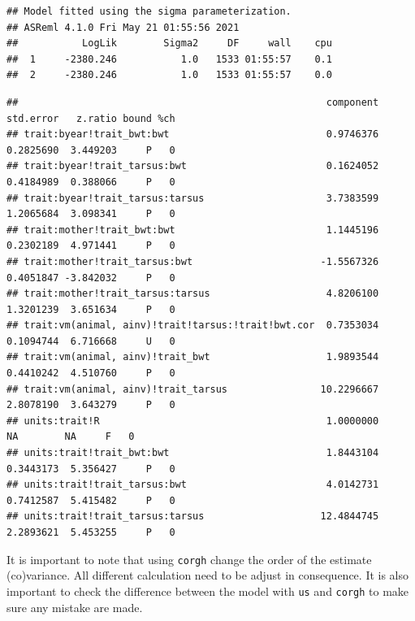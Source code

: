 \documentclass[
  12pt,
]{book}
\newenvironment{Shaded}{\begin{snugshade}}{\end{snugshade}}
\newcommand{\FunctionTok}[1]{\textcolor[rgb]{0.00,0.00,0.00}{#1}}
\newcommand{\NormalTok}[1]{#1}
\newcommand{\SpecialCharTok}[1]{\textcolor[rgb]{0.00,0.00,0.00}{#1}}
\begin{document}
\begin{verbatim}
## Model fitted using the sigma parameterization.
## ASReml 4.1.0 Fri May 21 01:55:56 2021
##           LogLik        Sigma2     DF     wall    cpu
##  1     -2380.246           1.0   1533 01:55:57    0.1
##  2     -2380.246           1.0   1533 01:55:57    0.0
\end{verbatim}

\begin{Shaded}
\end{Shaded}

\begin{verbatim}
##                                                     component std.error   z.ratio bound %ch
## trait:byear!trait_bwt:bwt                           0.9746376 0.2825690  3.449203     P   0
## trait:byear!trait_tarsus:bwt                        0.1624052 0.4184989  0.388066     P   0
## trait:byear!trait_tarsus:tarsus                     3.7383599 1.2065684  3.098341     P   0
## trait:mother!trait_bwt:bwt                          1.1445196 0.2302189  4.971441     P   0
## trait:mother!trait_tarsus:bwt                      -1.5567326 0.4051847 -3.842032     P   0
## trait:mother!trait_tarsus:tarsus                    4.8206100 1.3201239  3.651634     P   0
## trait:vm(animal, ainv)!trait!tarsus:!trait!bwt.cor  0.7353034 0.1094744  6.716668     U   0
## trait:vm(animal, ainv)!trait_bwt                    1.9893544 0.4410242  4.510760     P   0
## trait:vm(animal, ainv)!trait_tarsus                10.2296667 2.8078190  3.643279     P   0
## units:trait!R                                       1.0000000        NA        NA     F   0
## units:trait!trait_bwt:bwt                           1.8443104 0.3443173  5.356427     P   0
## units:trait!trait_tarsus:bwt                        4.0142731 0.7412587  5.415482     P   0
## units:trait!trait_tarsus:tarsus                    12.4844745 2.2893621  5.453255     P   0
\end{verbatim}

It is important to note that using \texttt{corgh} change the order of the estimate (co)variance. All different calculation need to be adjust in consequence.
It is also important to check the difference between the model with \texttt{us} and \texttt{corgh} to make sure any mistake are made.

\begin{Shaded}
\end{Shaded}
\end{document}
